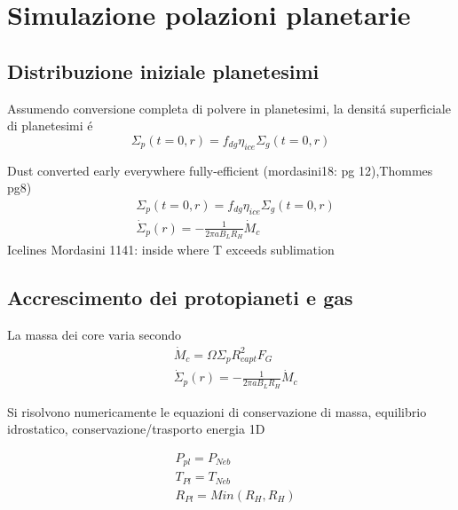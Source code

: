 {\let\clearpage\relax\let\cleardoublepage\relax
\chapter{Simulazione polazioni planetarie}
}

\section{Distribuzione iniziale planetesimi}
Assumendo conversione completa di polvere in planetesimi, la densit\'a superficiale di planetesimi \'e
\begin{equation}
\Sigma_p(t=0,r)=f_{dg}\eta_{ice}\Sigma_g(t=0,r)
\end{equation}

\begin{workout}
Dust converted early everywhere fully-efficient (mordasini18: pg 12),Thommes pg8)
\begin{align*}
&\Sigma_p(t=0,r)=f_{dg}\eta_{ice}\Sigma_g(t=0,r)\\
&\dot{\Sigma}_p(r)=-\frac{1}{2\pi aB_LR_H}\dot{M}_c
\end{align*}
Icelines Mordasini 1141: inside where T exceeds sublimation
\end{workout}

\section{Accrescimento dei protopianeti e gas}

La massa dei core varia secondo
\begin{align}
&\dot{M}_c=\Omega\Sigma_pR^2_{capt}F_G\\
&\dot{\Sigma}_p(r)=-\frac{1}{2\pi aB_LR_H}\dot{M}_c
\end{align}

Si risolvono numericamente le equazioni di conservazione di massa, equilibrio idrostatico, conservazione/trasporto energia 1D

\begin{workout}
\begin{align}
&P_{pl}=P_{Neb}\\
&T_{Pl}=T_{Neb}\\
&R_{Pl}=Min(R_H,R_H)
\end{align}
\end{workout}


